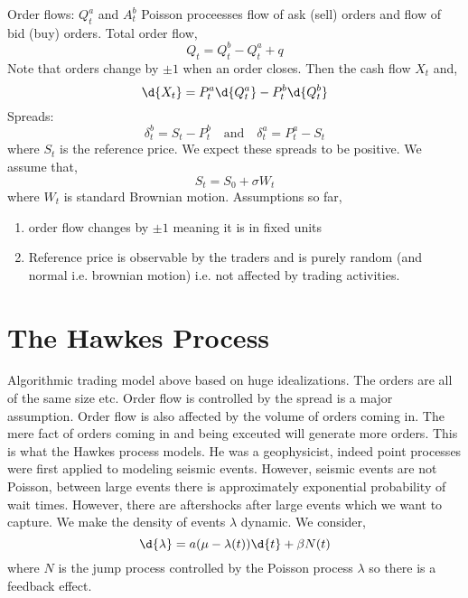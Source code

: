 \documentclass[12pt]{article}
\begin{document}
Order flows: $Q^a_t$ and $A^b_t$ Poisson proceesses flow of ask (sell) orders and flow of bid (buy) orders. Total order flow,
\[ Q_t = Q_t^b - Q_t^a + q \]
Note that orders change by $\pm 1$ when an order closes. Then the cash flow $X_t$ and,
\[ \d{X_t} = P^a_t \d{Q_t^a} - P^b_t \d{Q_t^b} \]
Spreads:
\[ \delta_t^b = S_t - P_t^b \quad \text{and} \quad \delta_t^a = P_t^a - S_t \]
where $S_t$ is the reference price. We expect these spreads to be positive. We assume that,
\[ S_t = S_0 + \sigma W_t \]
where $W_t$ is standard Brownian motion. Assumptions so far,
\begin{enumerate}
\item order flow changes by $\pm 1$ meaning it is in fixed units

\item Reference price is observable by the traders and is purely random (and normal i.e. brownian motion) i.e. not affected by trading activities. 
\end{enumerate}

\section{The Hawkes Process}

Algorithmic trading model above based on huge idealizations. The orders are all of the same size etc. Order flow is controlled by the spread is a major assumption. Order flow is also affected by the volume of orders coming in. The mere fact of orders coming in and being exceuted will generate more orders. This is what the Hawkes process models. He was a geophysicist, indeed point processes were first applied to modeling seismic events. However, seismic events are not Poisson, between large events there is approximately exponential probability of wait times. However, there are aftershocks after large events which we want to capture. We make the density of events $\lambda$ dynamic. We consider,
\[ \d{\lambda} = a( \mu - \lambda(t)) \d{t} + \beta N(t) \]
where $N$ is the jump process controlled by the Poisson process $\lambda$ so there is a feedback effect. 
\end{document}
